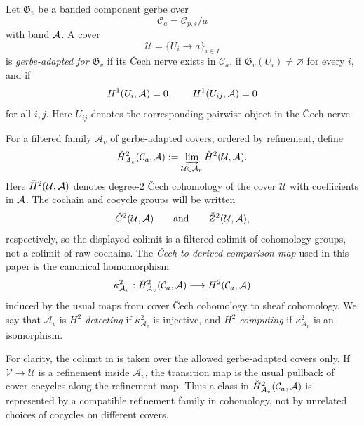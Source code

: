 \begin{definition}\label{def:gerbe-adapted-cech-comparison}
Let $\mathfrak G_v$ be a banded component gerbe over
\[
\mathcal C_a=\mathcal C_{p,s}/a
\]
with band $\mathcal{A}$. A cover
\[
\mathcal U=\{U_i\to a\}_{i\in I}
\]
is \emph{gerbe-adapted for $\mathfrak G_v$} if its \v{C}ech nerve exists in
$\mathcal C_a$, if $\mathfrak G_v(U_i)\neq\varnothing$ for every $i$, and if
\[
H^1(U_i,\mathcal{A})=0,
\qquad
H^1(U_{ij},\mathcal{A})=0
\]
for all $i,j$. Here $U_{ij}$ denotes the corresponding pairwise object in the
\v{C}ech nerve.

For a filtered family $\mathcal A_v$ of gerbe-adapted covers, ordered by
refinement, define
\[
\check H^2_{\mathcal A_v}(\mathcal C_a,\mathcal{A})
:=
\varinjlim_{\mathcal U\in\mathcal A_v}\check{H}^2(\mathcal U,\mathcal{A}).
\]
Here $\check{H}^2(\mathcal U,\mathcal{A})$ denotes degree-$2$ \v{C}ech cohomology of the
cover $\mathcal U$ with coefficients in $\mathcal{A}$. The cochain and cocycle groups
will be written
\[
\check C^2(\mathcal U,\mathcal{A})
\qquad\text{and}\qquad
\check Z^2(\mathcal U,\mathcal{A}),
\]
respectively, so the displayed colimit is a filtered colimit of cohomology
groups, not a colimit of raw cochains.
The \emph{\v{C}ech-to-derived comparison map} used in this paper is the
canonical homomorphism
\[
\kappa^2_{\mathcal A_v}:
\check H^2_{\mathcal A_v}(\mathcal C_a,\mathcal{A})
\longrightarrow
H^2(\mathcal C_a,\mathcal{A})
\]
induced by the usual maps from cover \v{C}ech cohomology to sheaf cohomology.
We say that $\mathcal A_v$ is \emph{$H^2$-detecting} if
$\kappa^2_{\mathcal A_v}$ is injective, and \emph{$H^2$-computing} if
$\kappa^2_{\mathcal A_v}$ is an isomorphism.
\end{definition}

For clarity, the colimit in  is taken
over the allowed gerbe-adapted covers only. If
$\mathcal V\to\mathcal U$ is a refinement inside $\mathcal A_v$, the transition
map is the usual pullback of cover cocycles along the refinement map. Thus a
class in $\check H^2_{\mathcal A_v}(\mathcal C_a,\mathcal{A})$ is represented by a
compatible refinement family in cohomology, not by unrelated choices of
cocycles on different covers.

